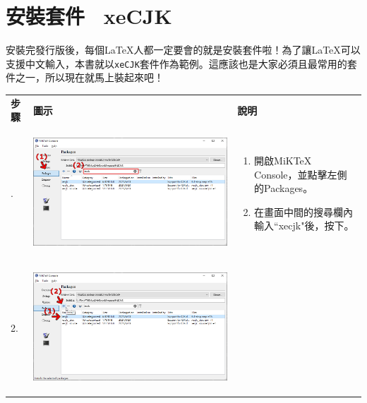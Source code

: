 \documentclass{../indiv}
\begin{document}
	\section{安裝套件 \textemdash\ xeCJK}
	安裝完發行版後，每個\LaTeX 人都一定要會的就是安裝套件啦！為了讓\LaTeX 可以支援中文輸入，本書就以\texttt{xeCJK}套件作為範例。這應該也是大家必須且最常用的套件之一，所以現在就馬上裝起來吧！
	\begin{table}[H]
		\centering
		\OSfamily
		\setlength{\tabcolsep}{10pt}
		\begin{tabular}{Z}
			\Thline
			 \textrm{\textbf{\large 步驟}} & \textbf{\large 圖示} & \textbf{\large 說明}\\. &
			\begin{tabmp}[-0.2]
				\centering
				\includegraphics[width=\linewidth]{xecjk-install-1.png}
			\end{tabmp} &
			\begin{tabmp}
				\begin{enumerate}[label=\texttt{(\arabic*)}, nosep, left=0pt, labelsep=0.5ex]
					\item 開啟MiKTeX Console，並點擊左側的Packages。
					\item 在畫面中間的搜尋欄內輸入``xecjk"後，按下\Enter。
				\end{enumerate}
			\end{tabmp}\\
			2. &
			\begin{tabmp}[-0.2]
				\centering
				\includegraphics[width=\linewidth]{xecjk-install-2.png}

\end{tabmp}
\end{tabular}
\end{table}
\end{document}
